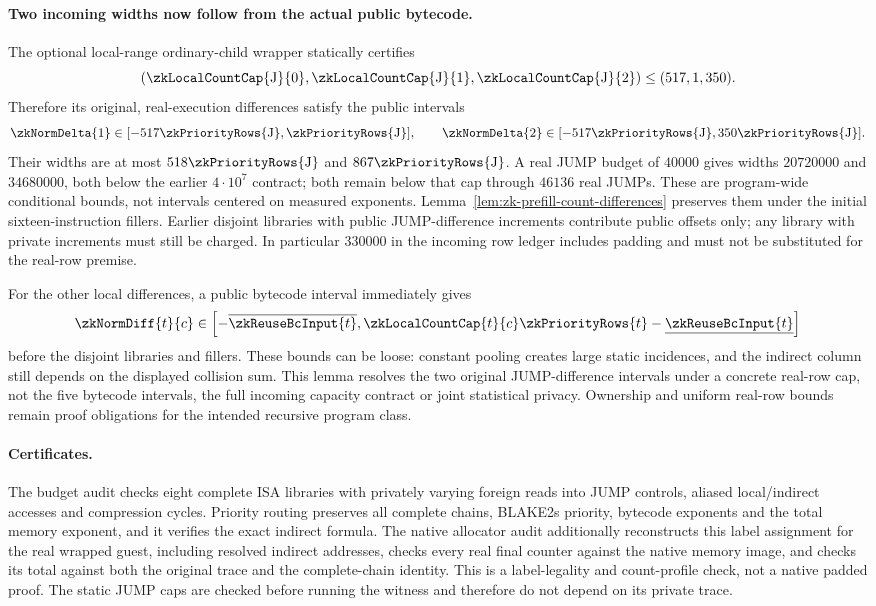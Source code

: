 \paragraph{Two incoming widths now follow from the actual public bytecode.} The optional local-range ordinary-child wrapper statically certifies
\[
 (\zkLocalCountCap{\mathrm J}{0},\zkLocalCountCap{\mathrm J}{1},\zkLocalCountCap{\mathrm J}{2})
 \le(517,1,350).
\]
Therefore its original, real-execution differences satisfy the public intervals
\[
 \zkNormDelta{1}\in[-517\zkPriorityRows{\mathrm J},\zkPriorityRows{\mathrm J}],
 \qquad
 \zkNormDelta{2}\in[-517\zkPriorityRows{\mathrm J},350\zkPriorityRows{\mathrm J}].
\]
Their widths are at most $518\zkPriorityRows{\mathrm J}$ and $867\zkPriorityRows{\mathrm J}$. A real JUMP budget of $40000$ gives widths $20720000$ and $34680000$, both below the earlier $4\cdot10^7$ contract; both remain below that cap through $46136$ real JUMPs. These are program-wide conditional bounds, not intervals centered on measured exponents. Lemma~\ref{lem:zk-prefill-count-differences} preserves them under the initial sixteen-instruction fillers. Earlier disjoint libraries with public JUMP-difference increments contribute public offsets only; any library with private increments must still be charged. In particular $330000$ in the incoming row ledger includes padding and must not be substituted for the real-row premise.

For the other local differences, a public bytecode interval immediately gives
\[
 \zkNormDiff{t}{c}\in\left[-\overline{\zkReuseBcInput{t}},
 \zkLocalCountCap{t}{c}\zkPriorityRows{t}-\underline{\zkReuseBcInput{t}}\right]
\]
before the disjoint libraries and fillers. These bounds can be loose: constant pooling creates large static incidences, and the indirect column still depends on the displayed collision sum. This lemma resolves the two original JUMP-difference intervals under a concrete real-row cap, not the five bytecode intervals, the full incoming capacity contract or joint statistical privacy. Ownership and uniform real-row bounds remain proof obligations for the intended recursive program class.

\paragraph{Certificates.} The budget audit checks eight complete ISA libraries with privately varying foreign reads into JUMP controls, aliased local/indirect accesses and compression cycles. Priority routing preserves all complete chains, BLAKE2s priority, bytecode exponents and the total memory exponent, and it verifies the exact indirect formula. The native allocator audit additionally reconstructs this label assignment for the real wrapped guest, including resolved indirect addresses, checks every real final counter against the native memory image, and checks its total against both the original trace and the complete-chain identity. This is a label-legality and count-profile check, not a native padded proof. The static JUMP caps are checked before running the witness and therefore do not depend on its private trace.


